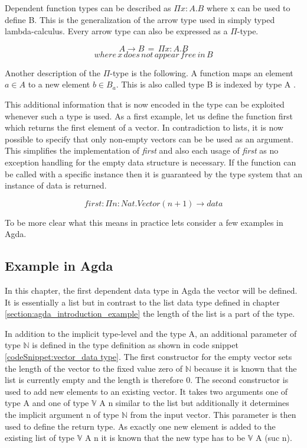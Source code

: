Dependent function types can be described as $\Pi x : A. B$ where x can be used to define B. 
This is the generalization of the arrow type used in simply typed lambda-calculus. Every arrow type can also be expressed as a $\Pi$-type.

$$A \rightarrow B \, = \, \Pi x:A.B$$
$$where \, x \, does \, not \, appear \, free \, in \, B$$

Another description of the $\Pi$-type is the following. A function maps an element $a \in A$ to a new element $b \in B_a$. 
This is also called type B is indexed by type A \cite{10.1145/2841316}.


This additional information that is now encoded in the type can be exploited whenever such a type is used. As a first example, let us define the function first which returns the first element of a vector.
In contradiction to lists, it is now possible to specify that only non-empty vectors can be be used as an argument. 
This simplifies the implementation of \emph{first} and also each usage of \emph{first} as no exception handling for the empty data structure is necessary. 
If the function can be called with a specific instance then it is guaranteed by the type system that an instance of data is returned.

$$first : \Pi n : Nat.Vector(n+1) \rightarrow data$$


To be more clear what this means in practice lets consider a few examples in Agda.

\subsection{Example in Agda}\label{section_dependent_types_example}
In this chapter, the first dependent data type in Agda the vector will be defined.
It is essentially a list but in contrast to the list data type defined in chapter \ref{section:agda_introduction_example} the length of the list is a part of the type.

In addition to the implicit type-level and the type A, an additional parameter of type $\mathbb{N}$ is defined in the type definition as shown in code snippet \ref{codeSnippet:vector_data type}.
The first constructor for the empty vector sets the length of the vector to the fixed value zero of $\mathbb{N}$ because it is known that the list is currently empty and the length is therefore 0.
The second constructor is used to add new elements to an existing vector. It takes two arguments one of type A and one of type $\mathbb{V}$ A n similar to the list but additionally it determines the implicit argument n of type $\mathbb{N}$ from the input vector.
This parameter is then used to define the return type. As exactly one new element is added to the existing list of type $\mathbb{V}$ A n it is known that the new type has to be $\mathbb{V}$ A (suc n).

